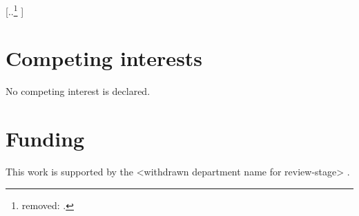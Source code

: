 \documentclass[unnumsec,webpdf,modern,medium]{oup-authoring-template}
\providecommand{\DIFaddtex}[1]{{\protect\color{blue} \sf #1}} %
\providecommand{\DIFdeltex}[1]{{\protect\color{red} [..\footnote{removed: #1} ]}} %
\providecommand{\DIFaddbegin}{} %
\providecommand{\DIFaddend}{} %
\providecommand{\DIFdelbegin}{} %
\providecommand{\DIFdelend}{} %
\providecommand{\DIFadd}[1]{\texorpdfstring{\DIFaddtex{#1}}{#1}} %
\providecommand{\DIFdel}[1]{\texorpdfstring{\DIFdeltex{#1}}{}} %
\newcommand{\DIFscaledelfig}{0.5}
\newlength{\DIFdelgraphicswidth} %
\newlength{\DIFdelgraphicsheight} %
\newcommand{\DIFaddincludegraphics}[2][]{{\color{blue}\fbox{\DIFOincludegraphics[#1]{#2}}}} %
\newcommand{\DIFdelincludegraphics}[2][]{%
\sbox{\DIFdelgraphicsbox}{\DIFOincludegraphics[#1]{#2}}%
\settoboxwidth{\DIFdelgraphicswidth}{\DIFdelgraphicsbox} %
\settoboxtotalheight{\DIFdelgraphicsheight}{\DIFdelgraphicsbox} %
\scalebox{\DIFscaledelfig}{%
\parbox[b]{\DIFdelgraphicswidth}{\usebox{\DIFdelgraphicsbox}\\[-\baselineskip] \rule{\DIFdelgraphicswidth}{0em}}\llap{\resizebox{\DIFdelgraphicswidth}{\DIFdelgraphicsheight}{%
\setlength{\unitlength}{\DIFdelgraphicswidth}%
\begin{picture}(1,1)%
\thicklines\linethickness{2pt} %
{\color[rgb]{1,0,0}\put(0,0){\framebox(1,1){}}}%
{\color[rgb]{1,0,0}\put(0,0){\line( 1,1){1}}}%
{\color[rgb]{1,0,0}\put(0,1){\line(1,-1){1}}}%
\end{picture}%
}\hspace*{3pt}}} %
} %
\DeclareRobustCommand{\DIFaddbegin}{\DIFOaddbegin \let\includegraphics\DIFaddincludegraphics} %
\DeclareRobustCommand{\DIFaddend}{\DIFOaddend \let\includegraphics\DIFOincludegraphics} %
\DeclareRobustCommand{\DIFdelbegin}{\DIFOdelbegin \let\includegraphics\DIFdelincludegraphics} %
\DeclareRobustCommand{\DIFdelend}{\DIFOaddend \let\includegraphics\DIFOincludegraphics} %
\begin{document}
\DIFdel{.
}%


\DIFdelend \section{Competing interests}
No competing interest is declared.

\DIFaddbegin \section{\DIFadd{Funding}}
\DIFadd{This work is supported by the <withdrawn department name for review-stage> .
}\DIFaddend 

\DIFdelbegin %



\DIFdelend %
\DIFaddbegin \singlespacing
\onecolumn
\DIFaddend 


\end{document}
